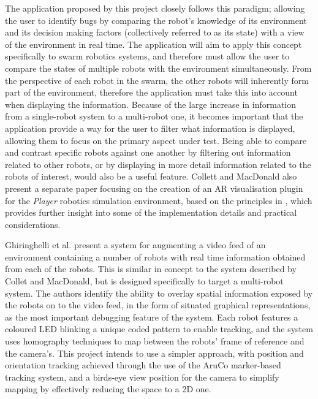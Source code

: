 \documentclass[titlepage,hidelinks,10pt]{article}
\begin{document}
The application proposed by this project closely follows this paradigm; allowing the user to identify bugs by comparing the robot's knowledge of its environment and its decision making factors (collectively referred to as its state) with a view of the environment in real time. The application will aim to apply this concept specifically to swarm robotics systems, and therefore must allow the user to compare the states of multiple robots with the environment simultaneously. From the perspective of each robot in the swarm, the other robots will inherently form part of the environment, therefore the application must take this into account when displaying the information. Because of the large increase in information from a single-robot system to a multi-robot one, it becomes important that the application provide a way for the user to filter what information is displayed, allowing them to focus on the primary aspect under test. Being able to compare and contrast specific robots against one another by filtering out information related to other robots, or by displaying in more detail information related to the robots of interest, would also be a useful feature. Collett and MacDonald also present a separate paper\cite{ARForPlayer} focusing on the creation of an AR visualisation plugin for the \textit{Player}\cite{Player} robotics simulation environment, based on the principles in \cite{AugmentedRealityDebuggingSystem}, which provides further insight into some of the implementation details and practical considerations.

Ghiringhelli\cite{LEDSwarmAR} et al. present a system for augmenting a video feed of an environment containing a number of robots with real time information obtained from each of the robots. This is similar in concept to the system described by Collet and MacDonald\cite{AugmentedRealityDebuggingSystem}, but is designed specifically to target a multi-robot system. The authors identify the ability to overlay spatial information exposed by the robots on to the video feed, in the form of situated graphical representations, as the most important debugging feature of the system. Each robot features a coloured LED blinking a unique coded pattern to enable tracking, and the system uses homography techniques to map between the robots' frame of reference and the camera's. This project intends to use a simpler approach, with position and orientation tracking achieved through the use of the AruCo\cite{AruCo} marker-based tracking system, and a birds-eye view position for the camera to simplify mapping by effectively reducing the space to a 2D one.
\end{document}
